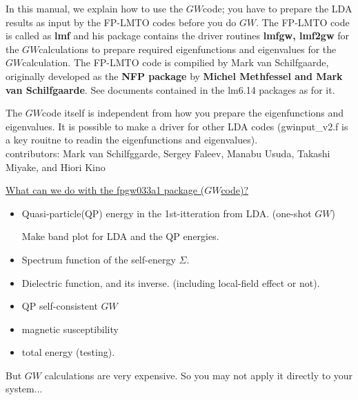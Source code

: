 \documentclass[a4paper,10pt,epsf,fleqn]{article}
\newcommand{\GW}{$GW$}
\begin{document}
In this manual, we explain how to use the \GW code; 
you have to prepare the LDA results as input 
by the FP-LMTO codes before you do \GW. 
The FP-LMTO code is called as {\bf lmf} and his package contains 
the driver routines {\bf lmfgw, lmf2gw}  for the \GW calculations
to prepare required eigenfunctions and eigenvalues for the \GW calculation.
The FP-LMTO code is compilied by Mark van Schilfgaarde, 
originally developed as the {\bf NFP package}
by {\bf Michel Methfessel and Mark van Schilfgaarde}.
See documents contained in the lm6.14 packages as for it.


%
The \GW code itself is independent from how you prepare 
the eigenfunctions and eigenvalues. It is possible
to make a driver for other LDA codes ({\sf gwinput\_v2.f} 
is a key rouitne to readin the eigenfunctions and eigenvalues).\\


\noindent contributors: Mark van Schilfggarde, Sergey Faleev,
Manabu Usuda, Takashi Miyake, and Hiori Kino
 

\newpage
\underline{What can we do with the fpgw033a1 package (\GW code)?}
\begin{itemize}
\item 
Quasi-particle(QP) energy in the 1st-itteration from LDA.
(one-shot \GW)

Make band plot for LDA and the QP energies.

\item
Spectrum function of the self-energy $\Sigma$.

\item
Dielectric function, and its inverse.
(including local-field effect or not).

\item
QP self-consistent \GW

\item
magnetic susceptibility

\item
total energy (testing).

\end{itemize}

But $GW$ calculations are very expensive. So you may not apply it directly to your system...\\
\end{document}
